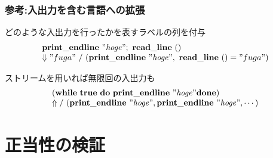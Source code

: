 \documentclass[dvipdfmx,cjk,xcolor=dvipsnames,envcountsect,notheorems,12pt]{beamer}
\theoremstyle{definition}
\newcommand{\keyword}[1]{\mathbf{#1}}
\newcommand{\TRUE}{\keyword{true}}
\newcommand{\WHILE}{\keyword{while}}
\newcommand{\DO}{\keyword{do}}
\newcommand{\DONE}{\keyword{done}}
\begin{document}
\begin{frame}
	\frametitle{参考:入出力を含む言語への拡張}
	\Large どのような入出力を行ったかを表すラベルの列を付与
	{\normalsize \[
			\begin{array}{l}
				\keyword{print\_endline}~\mathit{"hoge"};~\keyword{read\_line}~()\\
				\Downarrow "fuga"~/~(\keyword{print\_endline}~\mathit{"hoge"},~\keyword{read\_line}~()="fuga")
			\end{array}
	\]}

	ストリームを用いれば無限回の入出力も
	{\normalsize \[
		\begin{array}{l}
			(\WHILE~\TRUE~\DO~\keyword{print\_endline}~\mathit{"hoge"}\DONE) \\
			\Uparrow /~(\keyword{print\_endline}~\mathit{"hoge"}, \keyword{print\_endline}~\mathit{"hoge"}, \cdots)
		\end{array}
	\]}
\end{frame}


\section{正当性の検証}
\end{document}
